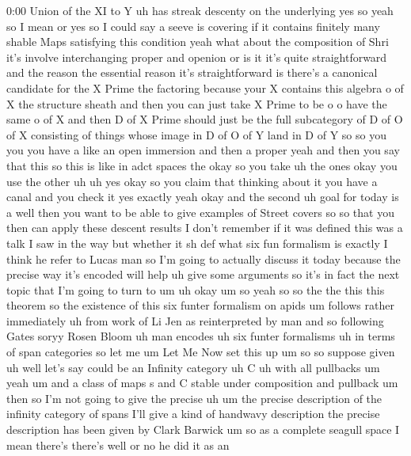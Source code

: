 \begin{unfinished}{0:00}
Union  of  the  XI  to  Y  uh  has  streak
descenty  on  the  underlying
yes
so  yeah  so  I  mean  or  yes  so  I  could  say
a  seeve  is  covering  if  it  contains
finitely  many  shable  Maps  satisfying
this  condition  yeah  what  about  the
composition  of  Shri  it's  involve
interchanging  proper  and  openion  or  is
it  it's  quite  straightforward  and  the
reason  the  essential  reason  it's
straightforward  is  there's  a  canonical
candidate  for  the  X  Prime
the
factoring  because  your  X  contains  this
algebra  o  of  X  the  structure  sheath  and
then  you  can  just  take  X  Prime  to  be  o  o
have  the  same  o  of  X  and  then  D  of  X
Prime  should  just  be  the  full
subcategory  of  D  of  O  of  X  consisting  of
things  whose  image  in  D  of  O  of  Y  land
in  D  of
Y
so  so  you  you  you  have  a  like  an  open
immersion  and  then  a  proper  yeah  and
then  you  say  that  this  so  this  is  like
in  adct  spaces
the  okay  so  you
take
uh  the  ones  okay  you  use  the
other
uh
uh  yes  okay  so  you  claim  that  thinking
about  it  you  have  a  canal  and  you  check
it  yes  exactly
yeah  okay  and  the  second  uh  goal  for
today  is  a  well  then  you  want  to  be  able
to  give  examples  of  Street  covers
so  so  that  you  then  can  apply  these
descent
results  I  don't  remember  if  it  was
defined  this  was  a  talk  I  saw  in  the  way
but  whether
it  sh  def  what  six  fun  formalism  is
exactly  I  think  he  refer  to  Lucas  man  so
I'm  going  to  actually  discuss  it  today
because  the  precise  way  it's  encoded
will  help  uh  give  some  arguments  so  it's
in  fact  the  next  topic  that  I'm  going  to
turn  to
um  uh
okay
um
so  yeah
so  so  the  the  this  this  theorem
so  the  existence  of  this  six  funter
formalism  on
apids  um  follows  rather  immediately
uh  from  work
of  Li
Jen  as
reinterpreted  by  man
and  so
following  Gates  soryy  Rosen
Bloom  uh
man  encodes  uh  six  funter
formalisms  uh  in  terms  of  span
categories  so  let  me  um  Let  Me  Now  set
this  up  um
so  so
suppose
given  uh  well  let's  say  could  be  an
Infinity
category  uh
C  uh  with  all
pullbacks
um
yeah
um  and  a  class  of
maps  s  and  C  stable
under
composition  and
pullback
um  then  so  I'm  not  going  to  give  the
precise  uh
um  the  precise  description  of  the
infinity  category  of
spans  I'll  give  a  kind  of  handwavy
description  the  precise  description  has
been  given  by  Clark  Barwick  um  so  as  a
complete  seagull  space  I  mean  there's
there's  well  or  no  he  did  it  as  an

\end{unfinished}

